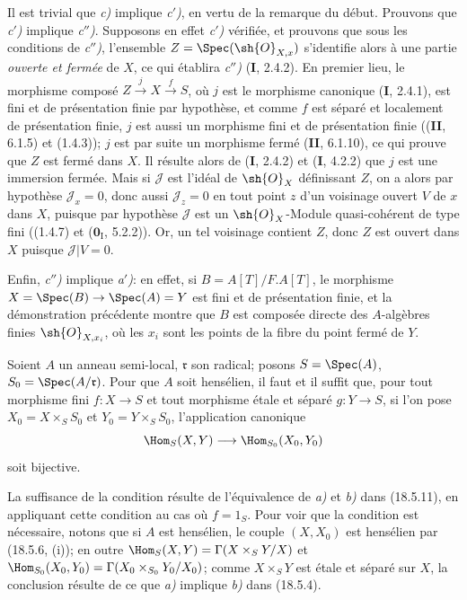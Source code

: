 Il est trivial que \emph{c)} implique \emph{c$'$)}, en vertu de la remarque du début. Prouvons que \emph{c$'$)} implique \emph{c$''$)}. Supposons en effet \emph{c$'$)} vérifiée, et prouvons que sous les conditions
de \emph{c$''$)}, l'ensemble $Z=\Spec(\sh{O}_{X,x})$ s'identifie alors à une partie \emph{ouverte et fermée} de $X$, ce qui établira \emph{c$''$)} (\textbf{I}, 2.4.2). En premier lieu, le morphisme composé $Z\xrightarrow{j}X\xrightarrow{f}S$, où $j$ est le morphisme canonique (\textbf{I}, 2.4.1), est fini et de présentation finie par hypothèse, et comme $f$ est séparé et localement de présentation finie, $j$ est aussi un morphisme fini et de présentation finie ((\textbf{II}, 6.1.5) et (1.4.3)); $j$ est par suite un morphisme fermé (\textbf{II}, 6.1.10), ce qui prouve que $Z$ est fermé dans $X$. Il résulte alors de (\textbf{I}, 2.4.2) et (\textbf{I}, 4.2.2) que $j$ est une immersion fermée. Mais si $\mathscr J$ est l'idéal de $\sh{O}_X$ définissant $Z$, on a alors par hypothèse $\mathscr J_x=0$, donc aussi $\mathscr J_z=0$ en tout point $z$ d'un voisinage ouvert $V$ de $x$ dans $X$, puisque par hypothèse $\mathscr J$ est un $\sh{O}_X$-Module quasi-cohérent de type fini ((1.4.7) et ($\mathbf{0}_{\mathrm I}$, 5.2.2)). Or, un tel voisinage contient $Z$, donc $Z$ est ouvert dans $X$ puisque $\mathscr J|V=0$.

Enfin, \emph{c$''$)} implique \emph{a$'$)}: en effet, si $B=A[T]/F.A[T]$, le morphisme $X=\Spec(B)\to\Spec(A)=Y$ est fini et de présentation finie, et la démonstration précédente montre que $B$ est composée directe des $A$-algèbres finies $\sh{O}_{X,x_i}$, où les $x_i$ sont les points de la fibre du point fermé de $Y$.

\begin{corollary}[18.5.12]
\label{IV.18.5.12}
Soient $A$ un anneau semi-local, $\mathfrak r$ son radical; posons $S=\Spec(A)$, $S_0=\Spec(A/\mathfrak r)$. Pour que $A$ soit hensélien, il faut et il suffit que, pour tout morphisme \textup{fini} $f:X\to S$ et tout morphisme \textup{étale et séparé} $g:Y\to S$, si l'on pose $X_0=X\times_S S_0$ \textup{et} $Y_0=Y\times_S S_0$, l'application canonique
\[
  \Hom_S(X,Y)\longrightarrow\Hom_{S_0}(X_0,Y_0)
\]
soit bijective.
\end{corollary}

La suffisance de la condition résulte de l'équivalence de \emph{a)} et \emph{b)} dans (18.5.11), en appliquant cette condition au cas où $f=1_S$. Pour voir que la condition est nécessaire, notons que si $A$ est hensélien, le couple $(X,X_0)$ est hensélien par (18.5.6, (i)); en outre $\Hom_S(X,Y)=\Gamma(X\times_S Y/X)$ et $\Hom_{S_0}(X_0,Y_0)=\Gamma(X_0\times_{S_0}Y_0/X_0)$; comme $X\times_S Y$ est étale et séparé sur $X$, la conclusion résulte de ce que \emph{a)} implique \emph{b)} dans (18.5.4).

